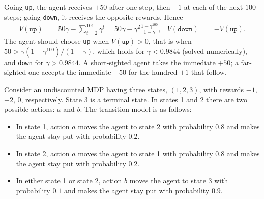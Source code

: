 \documentclass[11pt, a4paper]{exam}
\begin{document}
\begin{exercises}
\begin{center}
\end{center}

\begin{solution}
    Going \texttt{up}, the agent receives $+50$ after one step, then $-1$ at each of the next $100$ steps; going \texttt{down}, it receives the opposite rewards. Hence
    \begin{align*}
        V(\texttt{up}) & = 50 \gamma - \sum_{t=2}^{101} \gamma^t = 50 \gamma - \gamma^2 \frac{1 - \gamma^{100}}{1 - \gamma}, &
        V(\texttt{down}) & = -V(\texttt{up}).
    \end{align*}
    The agent should choose \texttt{up} when $V(\texttt{up}) > 0$, that is when $50 > \gamma (1 - \gamma^{100}) / (1 - \gamma)$, which holds for $\gamma < 0.9844$ (solved numerically), and \texttt{down} for $\gamma > 0.9844$. A short-sighted agent takes the immediate $+50$; a far-sighted one accepts the immediate $-50$ for the hundred $+1$ that follow.
\end{solution}


Consider an undiscounted MDP having three states, $(1, 2, 3)$, with rewards $-1$, $-2$, $0$, respectively. State 3 is a terminal state. In states 1 and 2 there are two possible actions: $a$ and $b$. The transition model is as follows:

\begin{itemize}
    \item In state 1, action $a$ moves the agent to state 2 with probability $0.8$ and makes the agent stay put with probability $0.2$.
    \item In state 2, action $a$ moves the agent to state 1 with probability $0.8$ and makes the agent stay put with probability 0.2.
    \item In either state 1 or state 2, action $b$ moves the agent to state 3 with probability $0.1$ and makes the agent stay put with probability $0.9$.
\end{itemize}


\end{exercises}
\end{document}
